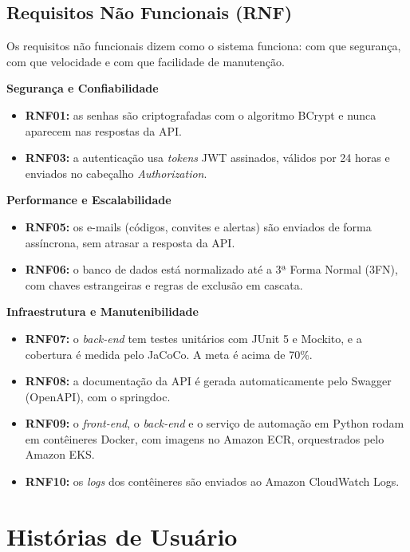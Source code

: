 \subsection{Requisitos Não Funcionais (RNF)}

Os requisitos não funcionais dizem como o sistema funciona: com que segurança, com que velocidade e com que facilidade de manutenção.

\textbf{Segurança e Confiabilidade}

\begin{itemize}
    \item \textbf{RNF01:} as senhas são criptografadas com o algoritmo BCrypt e nunca aparecem nas respostas da API.
    \item \textbf{RNF03:} a autenticação usa \textit{tokens} JWT assinados, válidos por 24 horas e enviados no cabeçalho \textit{Authorization}.
\end{itemize}

\textbf{Performance e Escalabilidade}

\begin{itemize}
    \item \textbf{RNF05:} os e-mails (códigos, convites e alertas) são enviados de forma assíncrona, sem atrasar a resposta da API.
    \item \textbf{RNF06:} o banco de dados está normalizado até a 3ª Forma Normal (3FN), com chaves estrangeiras e regras de exclusão em cascata.
\end{itemize}

\textbf{Infraestrutura e Manutenibilidade}

\begin{itemize}
    \item \textbf{RNF07:} o \textit{back-end} tem testes unitários com JUnit 5 e Mockito, e a cobertura é medida pelo JaCoCo. A meta é acima de 70\%.
    \item \textbf{RNF08:} a documentação da API é gerada automaticamente pelo Swagger (OpenAPI), com o springdoc.
    \item \textbf{RNF09:} o \textit{front-end}, o \textit{back-end} e o serviço de automação em Python rodam em contêineres Docker, com imagens no Amazon ECR, orquestrados pelo Amazon EKS.
    \item \textbf{RNF10:} os \textit{logs} dos contêineres são enviados ao Amazon CloudWatch Logs.
\end{itemize}

\section{Histórias de Usuário}

